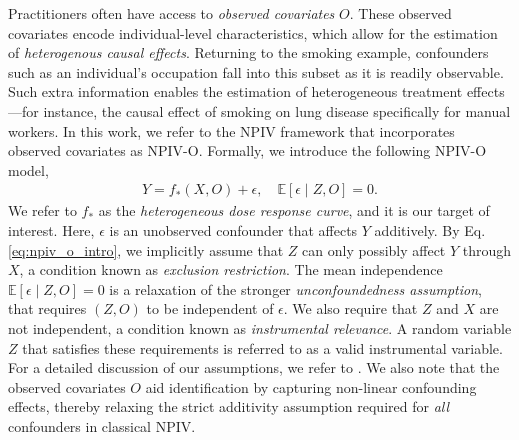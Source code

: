 \documentclass[11pt]{article}
\newcommand{\0}{\mathbf{0}}
\begin{document}
Practitioners often have access to \emph{observed covariates} $O$. These observed covariates encode individual-level characteristics, which allow for the estimation of \emph{heterogenous causal effects}. Returning to the smoking example, confounders such as an individual's occupation fall into this subset as it is readily observable. Such extra information enables the estimation of heterogeneous treatment effects---for instance, the causal effect of smoking on lung disease specifically for manual workers. In this work, we refer to the NPIV framework that incorporates observed covariates as NPIV-O. Formally, we introduce the following NPIV-O model,
\begin{align}
\label{eq:npiv_o_intro}
    Y = f_{\ast}(X, O) + \epsilon, \quad \mathbb{E}[\epsilon \mid Z, O] = 0  .
\end{align}
We refer to $f_{\ast}$ as the \emph{heterogeneous dose response curve}, and it is our target of interest. Here, $\epsilon$ is an unobserved confounder that affects $Y$ additively.  By Eq. \eqref{eq:npiv_o_intro}, we implicitly assume that $Z$ can only possibly affect $Y$ through $X$, a condition known as \emph{exclusion restriction}. The mean independence $\mathbb{E}[\epsilon\mid Z,O] = 0$ is a relaxation of the stronger \emph{unconfoundedness assumption}, that requires $(Z,O)$ to be independent of $\epsilon$. We also require that $Z$ and $X$ are not independent, a condition known as \emph{instrumental relevance}. A random variable $Z$ that satisfies these requirements is referred to as a valid instrumental variable. For a detailed discussion of our assumptions, we refer to . We also note that the observed covariates $O$ aid identification by capturing non-linear confounding effects, thereby relaxing the strict additivity assumption required for \emph{all} confounders in classical NPIV. 
\end{document}
